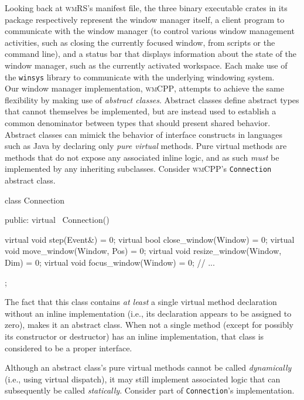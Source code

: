 Looking  back at  \textsc{wmRS}'s  manifest file,  the  three binary  executable
crates in its package respectively represent the window manager itself, a client
program  to communicate  with  the  window manager  (to  control various  window
management  activities,  such as  closing  the  currently focused  window,  from
scripts or the  command line), and a status bar  that displays information about
the state of the window manager, such as the currently activated workspace. Each
make  use of  the \texttt{winsys}  library  to communicate  with the  underlying
windowing system.\\

Our \cpp window manager implementation,  \textsc{wmCPP}, attempts to achieve the
same flexibility  by making use  of \textit{abstract classes}.  Abstract classes
define abstract  types that  cannot themselves be  implemented, but  are instead
used to establish a common denominator  between types that should present shared
behavior. Abstract  classes can mimick  the behavior of interface  constructs in
languages such  as Java  by declaring only  \textit{pure virtual}  methods. Pure
virtual methods are methods that do  not expose any associated inline logic, and
as  such \textit{must}  be implemented  by any  inheriting subclasses.  Consider
\textsc{wmCPP}'s \texttt{Connection} abstract class.


\begin{cppblock}
  class Connection
  {
  public:
    virtual ~Connection() {}
  
    virtual void step(Event&) = 0;
    virtual bool close_window(Window) = 0;
    virtual void move_window(Window, Pos) = 0;
    virtual void resize_window(Window, Dim) = 0;
    virtual void focus_window(Window) = 0;
    // ...
  };
\end{cppblock}

The fact  that this  class contains  \textit{at least}  a single  virtual method
declaration  without an  inline  implementation (i.e.,  its declaration  appears
to  be  assigned to  zero),  makes  it an  abstract  class.  When not  a  single
method  (except  for possibly  its  constructor  or  destructor) has  an  inline
implementation, that class is considered to be a proper interface.

Although   an  abstract   class's  pure   virtual  methods   cannot  be   called
\textit{dynamically}  (i.e., using  virtual  dispatch), it  may still  implement
associated logic  that can subsequently be  called \textit{statically}. Consider
part of \texttt{Connection}'s implementation.

